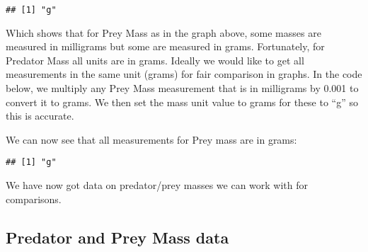 \documentclass[
]{article}
\newenvironment{Shaded}{\begin{snugshade}}{\end{snugshade}}
\newcommand{\CommentTok}[1]{\textcolor[rgb]{0.56,0.35,0.01}{\textit{#1}}}
\newcommand{\FloatTok}[1]{\textcolor[rgb]{0.00,0.00,0.81}{#1}}
\newcommand{\KeywordTok}[1]{\textcolor[rgb]{0.13,0.29,0.53}{\textbf{#1}}}
\newcommand{\NormalTok}[1]{#1}
\newcommand{\OperatorTok}[1]{\textcolor[rgb]{0.81,0.36,0.00}{\textbf{#1}}}
\newcommand{\StringTok}[1]{\textcolor[rgb]{0.31,0.60,0.02}{#1}}
\begin{document}
\begin{verbatim}
## [1] "g"
\end{verbatim}

Which shows that for Prey Mass as in the graph above, some masses are
measured in milligrams but some are measured in grams. Fortunately, for
Predator Mass all units are in grams. Ideally we would like to get all
measurements in the same unit (grams) for fair comparison in graphs. In
the code below, we multiply any Prey Mass measurement that is in
milligrams by 0.001 to convert it to grams. We then set the mass unit
value to grams for these to ``g'' so this is accurate.

\begin{Shaded}
\end{Shaded}

We can now see that all measurements for Prey mass are in grams:

\begin{Shaded}
\end{Shaded}

\begin{verbatim}
## [1] "g"
\end{verbatim}

We have now got data on predator/prey masses we can work with for
comparisons.

\hypertarget{predator-and-prey-mass-data}{%
\subsection{Predator and Prey Mass
data}\label{predator-and-prey-mass-data}}
\end{document}
